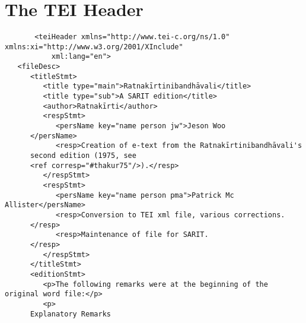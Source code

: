 \documentclass[article,12pt,a4paper]{memoir}%
\begin{document}
	 \chapter{The TEI Header}
	 \begin{verbatim}
       <teiHeader xmlns="http://www.tei-c.org/ns/1.0" xmlns:xi="http://www.w3.org/2001/XInclude"
           xml:lang="en">
   <fileDesc>
      <titleStmt>
         <title type="main">Ratnakīrtinibandhāvali</title>
         <title type="sub">A SARIT edition</title>
         <author>Ratnakīrti</author>
         <respStmt>
            <persName key="name person jw">Jeson Woo
	  </persName>
            <resp>Creation of e-text from the Ratnakīrtinibandhāvali's
	  second edition (1975, see
	  <ref corresp="#thakur75"/>).</resp>
         </respStmt>
         <respStmt>
            <persName key="name person pma">Patrick Mc Allister</persName>
            <resp>Conversion to TEI xml file, various corrections.
	  </resp>
            <resp>Maintenance of file for SARIT.
	  </resp>
         </respStmt>
      </titleStmt>
      <editionStmt>
         <p>The following remarks were at the beginning of the original word file:</p>
         <p>
	  Explanatory Remarks


\end{verbatim}
\end{document}
